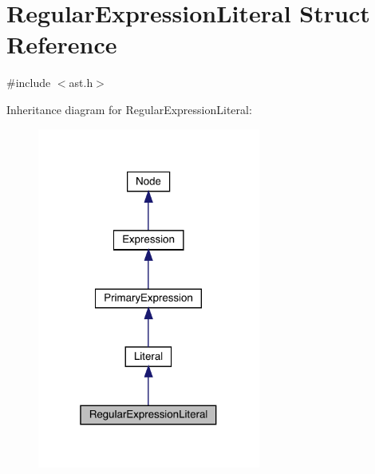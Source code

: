 \hypertarget{struct_regular_expression_literal}{}\section{Regular\+Expression\+Literal Struct Reference}
\label{struct_regular_expression_literal}


{\ttfamily \#include $<$ast.\+h$>$}



Inheritance diagram for Regular\+Expression\+Literal\+:
\nopagebreak
\begin{figure}[H]
\begin{center}
\leavevmode
\includegraphics[width=208pt]{struct_regular_expression_literal__inherit__graph}
\end{center}
\end{figure}


